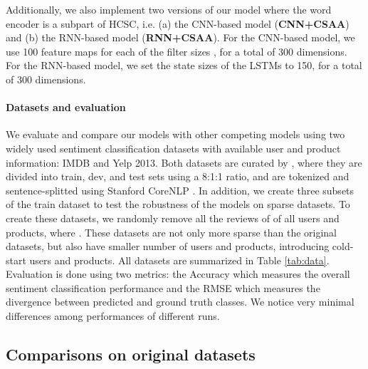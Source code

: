 \documentclass[11pt,a4paper]{article}
\begin{document}
Additionally, we also implement two versions of our model where the word encoder is a subpart of HCSC, i.e. (a) the CNN-based model (\textbf{CNN+CSAA}) and (b) the RNN-based model (\textbf{RNN+CSAA}). For the CNN-based model, we use 100 feature maps for each of the filter sizes , for a total of 300 dimensions. For the RNN-based model, we set the state sizes of the LSTMs to 150, for a total of 300 dimensions.

\paragraph{Datasets and evaluation}

We evaluate and compare our models with other competing models using two widely used sentiment classification datasets with available user and product information: IMDB and Yelp 2013. Both datasets are curated by \citet{tang2015learning}, where they are divided into train, dev, and test sets using a 8:1:1 ratio, and are tokenized and sentence-splitted using Stanford CoreNLP \cite{manning2014stanford}. In addition, we create three subsets of the train dataset to test the robustness of the models on sparse datasets. To create these datasets, we randomly remove all the reviews of  of all users and products, where . These datasets are not only more sparse than the original datasets, but also have smaller number of users and products, introducing cold-start users and products. All datasets are summarized in Table \ref{tab:data}.
Evaluation is done using two metrics: the Accuracy which measures the overall sentiment classification performance and the RMSE which measures the divergence between predicted and ground truth classes.
We notice very minimal differences among performances of different runs.

\subsection{Comparisons on original datasets}
\label{sec:results}
\end{document}
